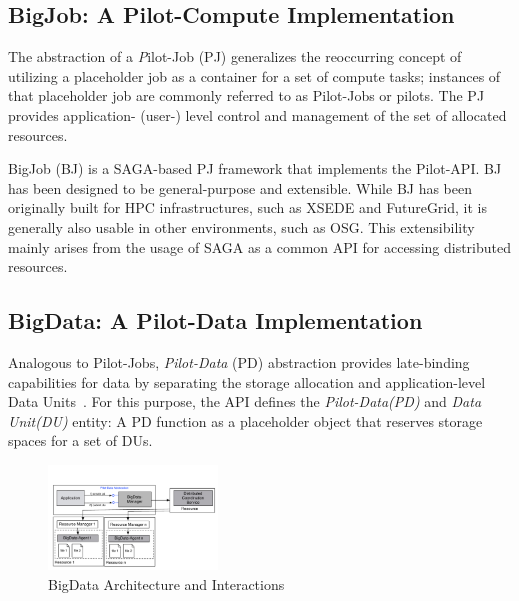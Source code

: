 \documentclass{sig-alternate}
\newcommand{\upp}{\vspace*{-0.5em}}
\newcommand{\pilotjob}{Pilot-Job\xspace}
\newcommand{\pilotjobs}{Pilot-Jobs\xspace}
\newcommand{\pilotcompute}{Pilot-Compute\xspace}
\newcommand{\dataunit}{Data Unit\xspace}
\newcommand{\dataunits}{Data Units\xspace}
\newcommand{\dus}{DUs\xspace}
\newcommand{\pilotdata}{Pilot-Data\xspace}
\newcommand{\pd}{PD\xspace}
\begin{document}
 
\subsection{BigJob: A \pilotcompute Implementation}

The abstraction of a {\emph \pilotjob} (PJ) generalizes the
reoccurring concept of utilizing a placeholder job as a container for
a set of compute tasks; instances of that placeholder job are commonly
referred to as Pilot-Jobs or pilots. The PJ provides application-
(user-) level control and management of the set of allocated resources.

BigJob (BJ) is a SAGA-based PJ framework that implements the Pilot-API. BJ has
been designed to be general-purpose and extensible. While BJ has been originally
built for HPC infrastructures, such as XSEDE and FutureGrid, it is generally
also usable in other environments, such as OSG. This extensibility mainly arises
from the usage of SAGA as a common API for accessing distributed resources.

\subsection{BigData: A \pilotdata Implementation}

Analogous to \pilotjobs, {\it Pilot-Data} (PD) abstraction provides late-binding
capabilities for data by separating the storage allocation and application-level
\dataunits~\cite{pstar-2012}. For this purpose, the API defines the {\it
\pilotdata (PD)} and {\it \dataunit (DU)} entity: A \pd function as a
placeholder object that reserves storage spaces for a set of \dus.

\begin{figure}[t]
	\upp\upp
	\centering
		\includegraphics[width=0.4\textwidth]{figures/bigdata1.pdf}
	\caption{BigData Architecture and Interactions\upp\upp\upp\upp\upp\upp}
	\label{fig:figures_bigdata}
\end{figure}
\end{document}
